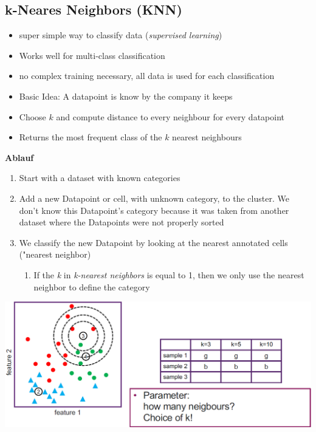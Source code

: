 \subsection{k-Neares Neighbors (KNN)}
\begin{itemize}
    \item super simple way to classify data (\textit{supervised learning})
    \item Works well for multi-class classification
    \item no complex training necessary, all data is used for each classification
    \item Basic Idea: A datapoint is know by the company it keeps
    \item Choose $k$ and compute distance to every neighbour for every datapoint
    \item Returns the most frequent class of the $k$ nearest neighbours\\
\end{itemize}
\textbf{Ablauf}
\begin{enumerate}
    \item Start with a dataset with known categories
    \item Add a new Datapoint or cell, with unknown category, to the cluster. We don't know this Datapoint's category because it was taken from another dataset where the Datapoints were not properly sorted
    \item We classify the new Datapoint by looking at the nearest annotated cells ("nearest neighbor)
    \begin{enumerate}
        \item If the \textit{k} in \textit{k-nearest neighbors} is equal to 1, then we only use the nearest neighbor to define the category
    \end{enumerate}
\end{enumerate}
\includegraphics[width=0.8\linewidth]{./img/knn.png}
